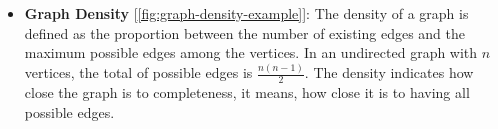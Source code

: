 \documentclass[../Thesis.tex]{subfiles}
\begin{document}
\begin{itemize}
		\item \textbf{Graph Density} [\autoref{fig:graph-density-example}]: The density of a graph is defined as the proportion between the number of existing edges and the maximum possible edges among the vertices. In an undirected graph with \( n \) vertices, the total of possible edges is \( \frac{n(n-1)}{2} \). The density indicates how close the graph is to completeness, it means,  how close it is to having all possible edges.
		
		
	\end{itemize}
	
\end{document}
